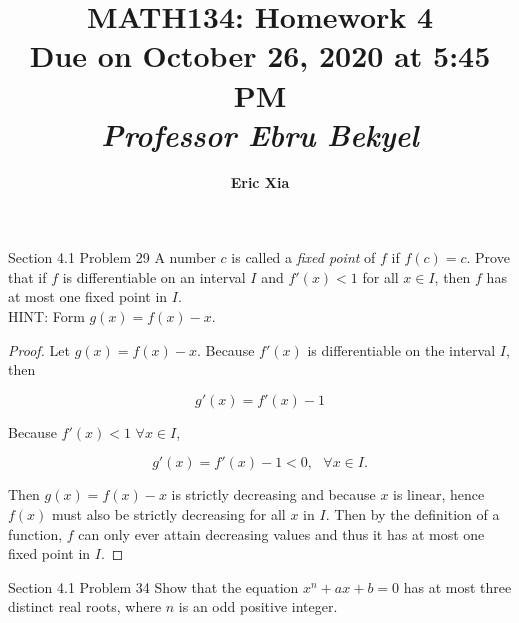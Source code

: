 \documentclass{article}
\title{
    \vspace{2in}
    \textmd{\textbf{MATH134: Homework 4}}\\
    \normalsize\vspace{0.1in}\small{Due on October 26, 2020 at 5:45 PM}\\
    \vspace{0.1in}\large{\textit{Professor Ebru Bekyel}}
    \vspace{3in}
}
\author{\textbf{Eric Xia}}
\date{}
\begin{document}
    \maketitle
    \pagebreak


    \thispagestyle{2}

    \begin{tbhtheorem}{Section 4.1 Problem 29}
        A number $c$ is called a \textit{fixed point} of $f$ if $f(c)=c$. Prove that if $f$ is differentiable on an interval $I$ and $f'(x)<1$ for all $x\in I$, then $f$ has at most one fixed point in $I$. \\
        HINT: Form $g(x)=f(x)-x$.
    \end{tbhtheorem}

    \begin{proof}
        Let $g(x)=f(x)-x$. Because $f'(x)$ is differentiable on the interval $I$, then

        \[
            g'(x) = f'(x) - 1
        \]

        Because $f'(x) < 1$ $\forall x\in I$,

        \[
            g'(x) = f'(x) - 1 < 0,\text{ }\forall x \in I.
        \]

        Then $g(x)=f(x)-x$ is strictly decreasing and because $x$ is linear, hence $f(x)$ must also be strictly decreasing for all $x$ in $I$. Then by the definition of a function, $f$ can only ever attain decreasing
        values and thus it has at most one fixed point in $I$.
    \end{proof}


    \begin{tbhtheorem}{Section 4.1 Problem 34}
        Show that the equation $x^n + ax + b = 0$ has at most three distinct real roots, where $n$ is an odd positive integer.
    \end{tbhtheorem}
\end{document}
